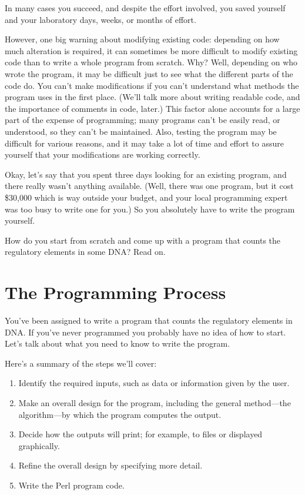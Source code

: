 In many cases you succeed, and despite the effort involved, you saved yourself and your laboratory days, weeks, or months of effort.

However, one big warning about modifying existing code: depending on how much alteration is required, it can sometimes be more difficult to modify existing code than to write a whole program from scratch. Why?  Well, depending on who wrote the program, it may be difficult just to see what the different parts of the code do. You can't make modifications if you can't understand what methods the program uses in the first place. (We'll talk more about writing readable code, and the importance of comments in code, later.) This factor alone accounts for a large part of the expense of programming; many programs can't be easily read, or understood, so they can't be maintained. Also, testing the program may be difficult for various reasons, and it may take a lot of time and effort to assure yourself that your modifications are working correctly.

Okay, let's say that you spent three days looking for an existing program, and there really wasn't anything available. (Well, there was one program, but it cost \$30,000 which is way outside your budget, and your local programming expert was too busy to write one for you.) So you absolutely have to write the program yourself.

How do you start from scratch and come up with a program that counts the regulatory elements in some DNA? Read on. 

\section{The Programming Process}
You've been assigned to write a program that counts the regulatory elements in DNA. If you've never programmed you probably have no idea of how to start. Let's talk about what you need to know to write the program.

Here's a summary of the steps we'll cover:

\begin{enumerate}
  \item Identify the required inputs, such as data or information given by the user.
  \item Make an overall design for the program, including the general method—the algorithm—by which the program computes the output.
  \item Decide how the outputs will print; for example, to files or displayed graphically.
  \item Refine the overall design by specifying more detail.  
  \item Write the Perl program code.
\end{enumerate}

